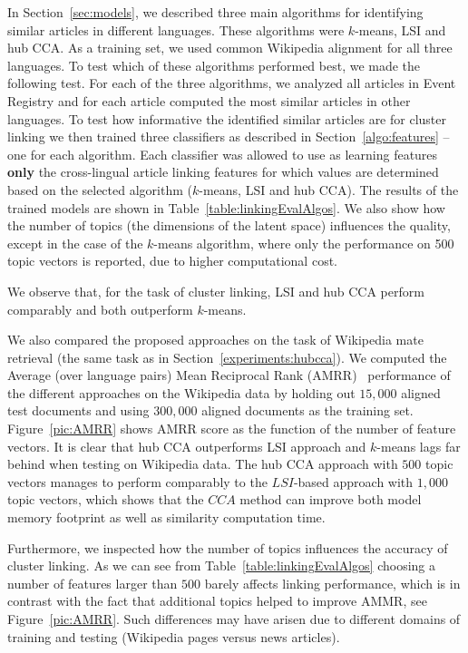 In Section~\ref{sec:models}, we  described three main algorithms for identifying similar articles in different languages. These algorithms were $k$-means, LSI and hub CCA. As a training set, we used common Wikipedia alignment for all three languages. To test which of these algorithms performed best, we made the following test. For each of the three algorithms, we analyzed all articles in Event Registry and for each article computed the most similar articles in other languages. To test how informative the identified similar articles are for cluster linking we then trained three classifiers as described in Section~\ref{algo:features} -- one for each algorithm. Each classifier was allowed to use as learning features \textbf{only} the cross-lingual article linking features for which values are determined based on the selected algorithm ($k$-means, LSI and hub CCA). The results of the trained models are shown in Table~\ref{table:linkingEvalAlgos}. We also show how the number of topics (the dimensions of the latent space) influences the quality, except in the case of the $k$-means algorithm, where only the performance on 500 topic vectors is reported, due to higher computational cost.

We observe that, for the task of cluster linking, LSI and hub CCA perform comparably and both outperform $k$-means.

We also compared the proposed approaches on the task of Wikipedia mate retrieval (the same task as in Section~\ref{experiments:hubcca}). We computed the Average (over language pairs) Mean Reciprocal Rank (AMRR)~\cite{voorhees1999trec}  performance of the different approaches on the  Wikipedia data by holding out $15,000$ aligned test documents and using $300,000$ aligned documents as the training set. Figure~\ref{pic:AMRR} shows AMRR score as the function of the number of feature vectors. It is clear that hub CCA outperforms LSI approach and $k$-means lags far behind when testing on Wikipedia data. The hub CCA approach with $500$ topic vectors manages to perform comparably to the $LSI$-based approach with $1,000$ topic vectors, which shows that the $CCA$ method can improve both model memory footprint as well as similarity computation time.

Furthermore, we inspected how the number of topics influences the accuracy of cluster linking. As we can see from Table~\ref{table:linkingEvalAlgos} choosing a number of features larger than $500$ barely affects linking performance, which is in contrast with the fact that additional topics helped to improve AMMR, see Figure~\ref{pic:AMRR}. Such differences may have arisen due to different domains of training and testing (Wikipedia pages versus news articles).


